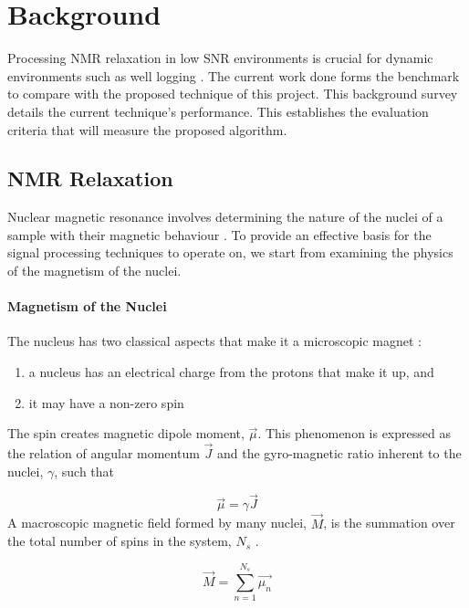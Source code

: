 \chapter{Background}\label{C:back}
Processing NMR relaxation in low SNR environments is crucial for dynamic environments such as well logging \cite{wellLoggingBook} \cite{UsingNMRPetrophysicalKenyon1992nuclear}. The current work done forms the benchmark to compare with the proposed technique of this project. This background survey details the current technique's performance. This establishes the evaluation criteria that will measure the proposed algorithm.

\section{NMR Relaxation}
Nuclear magnetic resonance involves determining the nature of the nuclei of a sample with their magnetic behaviour \cite{NMRSignalProcessingBook}. To provide an effective basis for the signal processing techniques to operate on, we start from examining the physics of the magnetism of the nuclei.

\subsubsection{Magnetism of the Nuclei}
The nucleus has two classical aspects that make it a microscopic magnet \cite{NMRSignalProcessingBook}:
\begin{enumerate}
    \item a nucleus has an electrical charge from the protons that make it up, and
    \item it may have a non-zero spin
\end{enumerate}
The spin creates magnetic dipole moment, $\vec{\mu}$. This phenomenon is expressed as the relation of angular momentum $\vec{J}$ and the gyro-magnetic ratio inherent to the nuclei, $\gamma$, such that

\begin{equation}
    \vec{\mu} = \gamma \vec{J}
    \label{eq:magneticMomentEquation}
\end{equation}
A macroscopic magnetic field formed by many nuclei, $\vec{M}$, is the summation over the total number of spins in the system, $N_s$  \cite{NMRSignalProcessingBook}.

\begin{equation}
    \vec{M} = \sum^{N_s}_{n = 1}\vec{\mu_{n}}
    \label{eq:macroMagnetic}
\end{equation}

